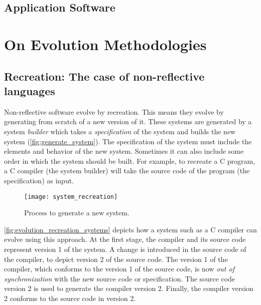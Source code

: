 \subsection{Application Software}

\section{On Evolution Methodologies}

\subsection{Recreation: The case of non-reflective languages}

Non-reflective software evolve by recreation. This means they evolve by generating from scratch of a new version of it. These systems are generated by a system \emph{builder} which takes a \emph{specification} of the system and builds the new system (\autoref{fig:generate_system}).
The specification of the system must include the elements and behavior of the new system. Sometimes it can also include some order in which the system should be built.
For example, to recreate a C program, a C compiler (the system builder) will take the source code of the program (the specification) as input.

\begin{figure}[!ht]
\begin{center}
\texttt{[image: system\_recreation]}
\caption{Process to generate a new system.\label{fig:generate_system}}
\end{center}
\end{figure}

\autoref{fig:evolution_recreation_systems} depicts how a system such as a C compiler can evolve using this approach.
At the first stage, the compiler and its source code represent version 1 of the system.
A change is introduced in the source code of the compiler, to depict version 2 of the source code.
The version 1 of the compiler, which conforms to the version 1 of the source code, is now \emph{out of synchronization} with the new source code or specification.
The source code version 2 is used to generate the compiler version 2.
Finally, the compiler version 2 conforms to the source code in version 2.


